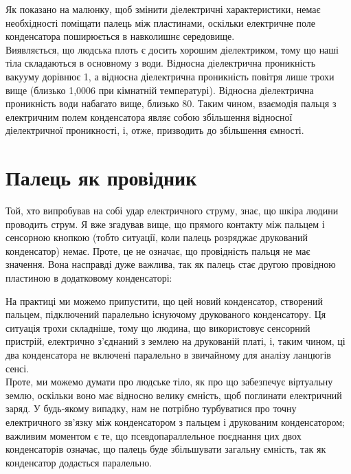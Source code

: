 \documentclass[a4paper,fontsize=12]{report}
\begin{document}
  \begin{figure}[h!]
  \end{figure}

  Як показано на малюнку, щоб змінити діелектричні характеристики, немає необхідності поміщати палець між пластинами, оскільки електричне поле конденсатора поширюється в навколишнє середовище.\\

  Виявляється, що людська плоть є досить хорошим діелектриком, тому що наші тіла складаються в основному з води. Відносна діелектрична проникність вакууму дорівнює 1, а відносна діелектрична проникність повітря лише трохи вище (близько 1,0006  при кімнатній температурі). Відносна діелектрична проникність води набагато вище, близько 80. Таким чином, взаємодія пальця з електричним полем конденсатора являє собою збільшення відносної діелектричної проникності, і, отже, призводить до збільшення ємності.
\section{Палець як провідник}
  Той, хто випробував на собі удар електричного струму, знає, що шкіра людини проводить струм. Я вже згадував вище, що прямого контакту між пальцем і сенсорною кнопкою (тобто ситуації, коли палець розряджає друкований конденсатор) немає. Проте, це не означає, що провідність пальця не має значення. Вона насправді дуже важлива, так як палець стає другою провідною пластиною в додатковому конденсаторі:

  \begin{figure}[h]
  \end{figure}

  На практиці ми можемо припустити, що цей новий конденсатор, створений пальцем, підключений паралельно існуючому друкованого конденсатору. Ця ситуація трохи складніше, тому що людина, що використовує сенсорний пристрій, електрично з'єднаний з землею на друкованій платі, і, таким чином, ці два конденсатора не включені паралельно в звичайному для аналізу ланцюгів сенсі.\\

  Проте, ми можемо думати про людське тіло, як про що забезпечує віртуальну землю, оскільки воно має відносно велику ємність, щоб поглинати електричний заряд. У будь-якому випадку, нам не потрібно турбуватися про точну електричного зв'язку між конденсатором з пальцем і друкованим конденсатором; важливим моментом є те, що псевдопараллельное поєднання цих двох конденсаторів означає, що палець буде збільшувати загальну ємність, так як конденсатор додається паралельно.\\
\end{document}
